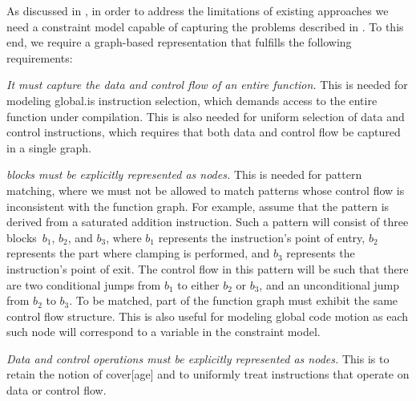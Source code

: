As discussed in , in order to
address the limitations of existing approaches we need a \gls{constraint model}
capable of capturing the problems described in .
%
To this end, we require a \gls{graph}-based representation that fulfills the
following requirements:
%
\def\typesetReq#1{\emph{#1}}%
\begin{requirements}
  \item {}
    \typesetReq{It must capture the data and control flow of an entire
      \gls{function}.}
    This is needed for modeling \gls{global.is} \gls{instruction selection},
    which demands access to the entire \gls{function} under compilation.
    This is also needed for uniform selection of data and control
    \glspl{instruction}, which requires that both data and control flow be
    captured in a single \gls{graph}.

  \item {}
    \typesetReq{\Glspl{block} must be explicitly represented as \glspl{node}.}
    This is needed for \gls{pattern matching}, where we must not be allowed to
    match \glspl{pattern} whose control flow is inconsistent with the
    \gls{function graph}.
    For example, assume that the \gls{pattern} is derived from a saturated
    addition \gls{instruction}.
    Such a \gls{pattern} will consist of three \glspl{block}~$b_1$, $b_2$, and
    $b_3$, where $b_1$ represents the \gls{instruction}'s point of entry, $b_2$
    represents the part where clamping is performed, and $b_3$ represents the
    \gls{instruction}'s point of exit.
    The control flow in this \gls{pattern} will be such that there are two
    conditional jumps from $b_1$ to either $b_2$ or $b_3$, and an unconditional
    jump from $b_2$ to $b_3$.
    To be matched, part of the \gls{function graph} must exhibit the same
    control flow structure.
    This is also useful for modeling \gls{global code motion} as each such
    \gls{node} will correspond to a \gls{variable} in the \gls{constraint
      model}.

  \item {}
    \typesetReq{Data and control \glspl{operation} must be explicitly
      represented as \glspl{node}.}
    This is to retain the notion of \gls{cover}[age] and to uniformly treat
    \glspl{instruction} that operate on data or control flow.


\end{requirements}
